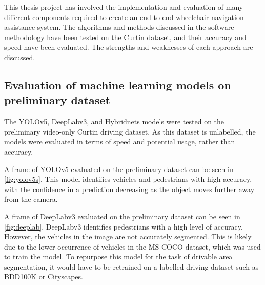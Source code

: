 This thesis project has involved the implementation and evaluation
of many different components required to create an end-to-end wheelchair
navigation assistance system. The algorithms and methods discussed in the
software methodology have been tested on the Curtin dataset, and their accuracy
and speed have been evaluated. The strengths and weaknesses of
each approach are discussed.

\subsection{Evaluation of machine learning models on preliminary dataset}
The YOLOv5, DeepLabv3, and Hybridnets models were tested on the preliminary
video-only Curtin driving dataset. As this dataset is unlabelled, the
models were evaluated in terms of speed and potential usage, rather than accuracy.

A frame of YOLOv5 evaluated on the preliminary dataset can be seen in \cref{fig:yolov5s}.
This model identifies vehicles and pedestrians with high accuracy, with the confidence in
a prediction decreasing as the object moves further away from the camera.

A frame of DeepLabv3 evaluated on the preliminary dataset can be seen in \cref{fig:deeplab}.
DeepLabv3 identifies pedestrians with a high level of accuracy. However, the vehicles in the
image are not accurately segmented. This is likely due to the lower occurrence of vehicles
in the MS COCO dataset, which was used to train the model.
To repurpose this model for the task of drivable area segmentation,
it would have to be retrained on a labelled driving dataset such as BDD100K or Cityscapes.

